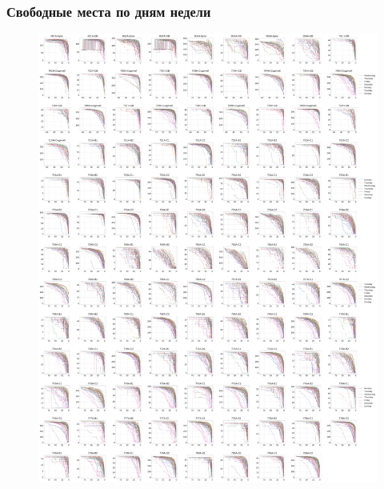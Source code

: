 \documentclass[11pt,aspectratio=169]{beamer}
\begin{document}
\begin{frame}
    \frametitle{Свободные места по дням недели}

    \begin{figure}
        \centering
        \includegraphics[width=\textwidth]{../data/figures/places_vs_weekday.pdf}
    \end{figure}

\end{frame}
\end{document}

